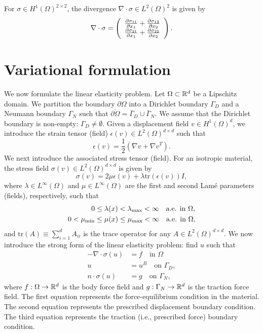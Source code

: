\begin{corollary}
  For $\sigma \in H^1(\Omega)^{2 \times 2}$, the divergence $\nabla \cdot \sigma \in L^2(\Omega)^2$ is given by
  \begin{equation*}
    \nabla \cdot \sigma =
    \bmat{c}
    \pp{\sigma_{11}}{x_1} + \pp{\sigma_{12}}{x_2} \\
    \pp{\sigma_{21}}{x_1} + \pp{\sigma_{22}}{x_2}
    \emat .
  \end{equation*}
\end{corollary}
\section{Variational formulation}
We now formulate the linear elasticity problem. Let $\Omega \subset \RR^d$ be a Lipschitz domain. We partition the boundary $\partial \Omega$ into a Dirichlet boundary $\Gamma_D$ and a Neumann boundary $\Gamma_N$ such that $\overline{\partial \Omega} = \bar{\Gamma}_D \cup \bar{\Gamma}_N$. We assume that the Dirichlet boundary is non-empty: $\Gamma_D \neq \emptyset$. Given a displacement field $v \in H^1(\Omega)^d$, we introduce the strain tensor (field) $\epsilon(v) \in L^2(\Omega)^{d \times d}$ such that
\begin{equation*}
  \epsilon(v) = \frac{1}{2} (\nabla v + \nabla v^T).
\end{equation*}
We next introduce the associated stress tensor (field).  For an isotropic material, the stress field $\sigma(v) \in L^2(\Omega)^{d \times d}$ is given by
\begin{equation*}
  \sigma(v) = 2 \mu \epsilon(v) + \lambda \text{tr}(\epsilon(v)) I,
\end{equation*}
where $\lambda \in L^\infty(\Omega)$ and $\mu \in L^\infty(\Omega)$ are the first and second Lam\'e parameters (fields), respectively, such that
\begin{align*}
  0 &\leq \lambda(x) < \lambda_{\rm max} < \infty \quad \text{a.e. in } \Omega,\\
  0 < \mu_{\rm min} &\leq \mu(x) \leq \mu_{\rm max} < \infty \quad \text{a.e. in } \Omega,
\end{align*}
and $\text{tr}(A) \equiv \sum_{i=1}^d A_{ii}$ is the trace operator for any $A \in L^2(\Omega)^{d \times d}$. We now introduce the strong form of the linear elasticity problem: find $u$ such that
\begin{align*}
  - \nabla \cdot \sigma(u) &= f \quad \text{in } \Omega \\
  u &= u^B \quad \text{on } \Gamma_{D}, \\
  n \cdot \sigma(u) &= g \quad \text{on } \Gamma_{N},
\end{align*}
where $f: \Omega \to \RR^d$ is the body force field and $g: \Gamma_N \to \RR^d$ is the traction force field. The first equation represents the force-equilibrium condition in the material.  The second equation represents the prescribed displacement boundary condition.  The third equation represents the traction (i.e., prescribed force) boundary condition.

